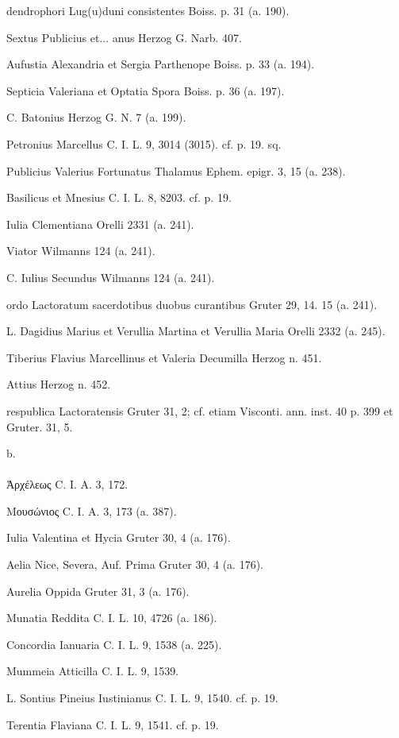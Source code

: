 \documentclass[a4paper, 11pt, oneside, polutonikogreek, german, twocolumn]{article}
\begin{document}
dendrophori Lug(u)duni consistentes Boiss. p. 31 (a. 190).

Sextus Publicius et... anus Herzog G. Narb. 407.

Aufustia Alexandria et Sergia Parthenope Boiss. p. 33 (a. 194).

Septicia Valeriana et Optatia Spora Boiss. p. 36 (a. 197).

C. Batonius Herzog G. N. 7 (a. 199).

Petronius Marcellus C. I. L. 9, 3014 (3015). cf. p. 19. sq.

Publicius Valerius Fortunatus Thalamus Ephem. epigr. 3, 15 (a. 238).

Basilicus et Mnesius C. I. L. 8, 8203. cf. p. 19.

Iulia Clementiana Orelli 2331 (a. 241).

Viator Wilmanns 124 (a. 241).

C. Iulius Secundus Wilmanns 124 (a. 241).

ordo Lactoratum sacerdotibus duobus curantibus Gruter 29, 14. 15 (a. 241).

L. Dagidius Marius et Verullia Martina et Verullia Maria Orelli 2332 (a. 245).

Tiberius Flavius Marcellinus et Valeria Decumilla Herzog n. 451.

Attius Herzog n. 452.

respublica Lactoratensis Gruter 31, 2; cf. etiam Visconti. ann. inst. 40 p. 399 et Gruter. 31, 5.
\begin{center}
b.
\end{center}
\paragraph{}
Ἀρχέλεως C. I. A. 3, 172.

Μουσώνιος C. I. A. 3, 173 (a. 387).

Iulia Valentina et Hycia Gruter 30, 4 (a. 176).

Aelia Nice, Severa, Auf. Prima Gruter 30, 4 (a. 176).

Aurelia Oppida Gruter 31, 3 (a. 176).

Munatia Reddita C. I. L. 10, 4726 (a. 186).

Concordia Ianuaria C. I. L. 9, 1538 (a. 225).

Mummeia Atticilla C. I. L. 9, 1539.

L. Sontius Pineius Iustinianus C. I. L. 9, 1540. cf. p. 19.

Terentia Flaviana C. I. L. 9, 1541. cf. p. 19.
\end{document}

